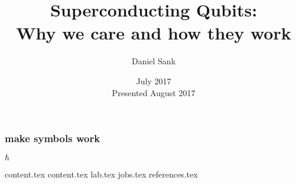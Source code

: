 \documentclass{beamer}
\title{Superconducting Qubits:\\Why we care and how they work}
\author{Daniel Sank}
\date{July 2017\\Presented August 2017}
\begin{document}
\maketitle

\begin{frame}\frametitle{make symbols work}$\hbar$\end{frame}
{content.tex}
{content.tex}
{lab.tex}
{jobs.tex}
{references.tex}
\end{document}
